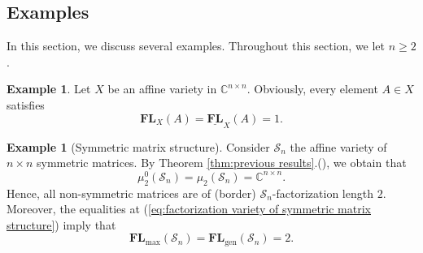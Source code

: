 \documentclass[reqno]{amsart}
\newtheorem{lemma}[theorem]{Lemma}
\theoremstyle{definition}
\newtheorem{example}[theorem]{Example}
\newcommand{\C}{\mathbb{C}}
\numberwithin{equation}{section}
\begin{document}

\subsection{Examples}\label{subsection:Examples}

In this section, we discuss several examples. Throughout this section, we let $n \geq 2$.

\begin{example}
    Let $X$ be an affine variety in $\mathbb{C}^{n \times n}$. Obviously, every element $A \in X$ satisfies
    \begin{equation*}
        \mathbf{FL}_X(A)=\underline{\mathbf{FL}}_X(A)=1.
    \end{equation*}
\end{example}

\begin{example}[Symmetric matrix structure]
    Consider $\mathcal{S}_n$ the affine variety of $n \times n$ symmetric matrices. By Theorem \ref{thm:previous results}.(), we obtain that  
    \begin{equation}\label{eq:factorization variety of symmetric matrix structure}
        \mu_2^0(\mathcal{S}_n)=\mu_2(\mathcal{S}_n)=\C^{n \times n}.
    \end{equation}
    Hence, all non-symmetric matrices are of (border) $\mathcal{S}_n$-factorization length $2$. Moreover, the equalities at (\ref{eq:factorization variety of symmetric matrix structure}) imply that
    \begin{equation*}
        \mathbf{FL}_{\text{max}}(\mathcal{S}_n)=\mathbf{FL}_{\text{gen}}(\mathcal{S}_n)=2.
    \end{equation*}
\end{example}
\end{document}
